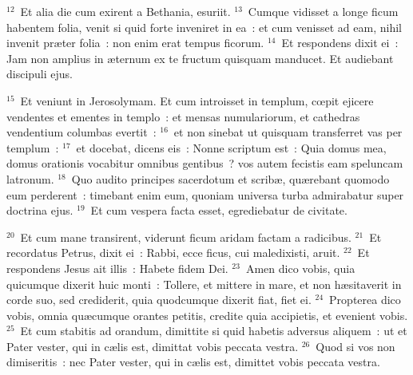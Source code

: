 ${}^{12}$~Et alia die cum exirent a Bethania, esuriit.
${}^{13}$~Cumque vidisset a longe ficum habentem folia, venit si quid forte inveniret in ea~: et cum venisset ad eam, nihil invenit pr\ae ter folia~: non enim erat tempus ficorum.
${}^{14}$~Et respondens dixit ei~: Jam non amplius in \ae ternum ex te fructum quisquam manducet. Et audiebant discipuli ejus.


${}^{15}$~Et veniunt in Jerosolymam. Et cum introisset in templum, cœpit ejicere vendentes et ementes in templo~: et mensas numulariorum, et cathedras vendentium columbas evertit~:
${}^{16}$~et non sinebat ut quisquam transferret vas per templum~:
${}^{17}$~et docebat, dicens eis~: Nonne scriptum est~: Quia domus mea, domus orationis vocabitur omnibus gentibus~? vos autem fecistis eam speluncam latronum.
${}^{18}$~Quo audito principes sacerdotum et scrib\ae , qu\ae rebant quomodo eum perderent~: timebant enim eum, quoniam universa turba admirabatur super doctrina ejus.
${}^{19}$~Et cum vespera facta esset, egrediebatur de civitate.


${}^{20}$~Et cum mane transirent, viderunt ficum aridam factam a radicibus.
${}^{21}$~Et recordatus Petrus, dixit ei~: Rabbi, ecce ficus, cui maledixisti, aruit.
${}^{22}$~Et respondens Jesus ait illis~: Habete fidem Dei.
${}^{23}$~Amen dico vobis, quia quicumque dixerit huic monti~: Tollere, et mittere in mare, et non h\ae sitaverit in corde suo, sed crediderit, quia quodcumque dixerit fiat, fiet ei.
${}^{24}$~Propterea dico vobis, omnia qu\ae cumque orantes petitis, credite quia accipietis, et evenient vobis.
${}^{25}$~Et cum stabitis ad orandum, dimittite si quid habetis adversus aliquem~: ut et Pater vester, qui in c\ae lis est, dimittat vobis peccata vestra.
${}^{26}$~Quod si vos non dimiseritis~: nec Pater vester, qui in c\ae lis est, dimittet vobis peccata vestra.


